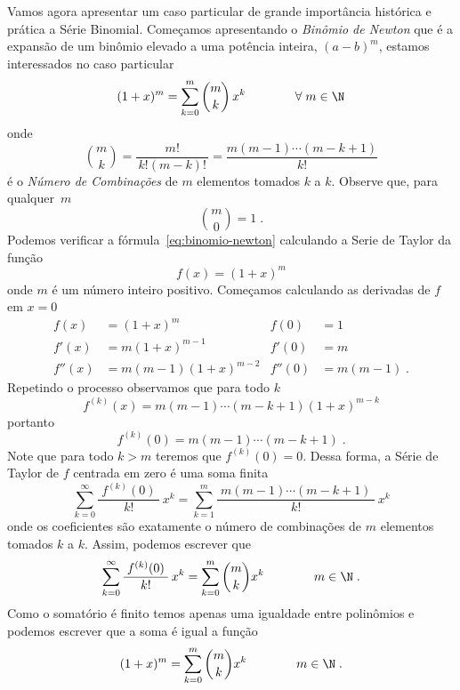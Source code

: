 Vamos agora apresentar um caso particular de grande importância histórica e
prática a Série Binomial.
Começamos apresentando o
\emph{Binômio de Newton}
que é a expansão de um binômio elevado a uma potência inteira, $(a-b)^m$,
estamos interessados no caso particular
\begin{equation}
  \label{eq:binomio-newton}
  (1+x)^m = \sum_{k=0}^m \binom{m}{k} \, x^k
  \qquad\qquad \forall\; m\in \N
\end{equation}
onde
\begin{equation}
  \label{eq:combinacoes}
  \binom{m}{k}
  = \frac{m!}{\,k!(m-k)!\,}
  = \frac{m(m-1)\cdots(m-k+1)}{k!}
\end{equation}
é o \emph{Número de Combinações}
de $m$ elementos tomados $k$ a $k$. Observe que, para qualquer~$m$
\[
  \binom{m}{0} = 1    \;.
\]
Podemos verificar a fórmula~\eqref{eq:binomio-newton}
calculando a Serie de Taylor da função
\[
  f(x) = (1+x)^m
\]
onde $m$ é um número inteiro positivo.
Começamos calculando as derivadas de $f$ em $x=0$
\begin{align*}
  f(x)   & = (1+x)^m           & f(0)   & = 1      \\[2mm]
  f'(x)  & = m(1+x)^{m-1}      & f'(0)  & = m      \\[2mm]
  f''(x) & = m(m-1)(1+x)^{m-2} & f''(0) & = m(m-1) \;.
\end{align*}
Repetindo o processo observamos que para todo $k$
\[
  f^{(k)}(x) = m(m-1)\cdots (m-k+1)(1+x)^{m-k}
\]
portanto
\[
  f^{(k)}(0) = m(m-1)\cdots (m-k+1)  \;.
\]
Note que para todo $k>m$ teremos que $f^{(k)}(0)=0$.
Dessa forma, a Série de Taylor de $f$ centrada em zero é
uma soma finita
\[
  \sum_{k=0}^\infty \frac{\;f^{(k)}(0)\;}          {k!}\,x^k =
  \sum_{k=1}^m      \frac{\;m(m-1)\cdots (m-k+1)\;}{k!}\,x^k
\]
onde os coeficientes são exatamente o
número de combinações de $m$ elementos tomados $k$ a $k$.
Assim, podemos escrever que
\begin{equation}
  \label{eq:binomio-newton-2}
  \sum_{k=0}^\infty \frac{\;f^{(k)}(0)\;}{k!}\,x^k =
  \sum_{k=0}^m \binom{m}{k} x^k
  \qquad\qquad m \in \N    \;.
\end{equation}
Como o somatório é finito temos apenas uma igualdade entre polinômios
e podemos escrever que a soma é igual a função
\[
  (1+x)^m = \sum_{k=0}^m \binom{m}{k} x^k
  \qquad\qquad m \in \N     \;.
\]

